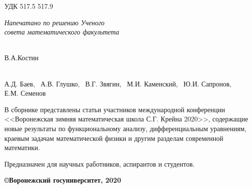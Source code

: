 \noindent УДК 517.5 517.9

\begin{flushright}
{\it Напечатано по решению Ученого \\ совета математического
факультета \\
}
 \end{flushright}
\vspace{15mm}{\bf Материалы работы международной конференции <<Воронежская зимняя математическая школа С.Г.
Крейна - 2020>>. Воронеж: ВГУ, 2020 -  с.}

\vspace{5mm}

 \\
В.А.Костин

\vspace{5mm}

 \\
А.Д. Баев, \  А.В. Глушко, \ В.Г. Звягин, \ М.И. Каменский, \ Ю.И. Сапронов, \\
Е.М. Семенов

\vspace{15mm}

В сборнике представлены статьи участников международной конференции <<Воронежская зимняя математическая школа С.Г. Крейна 2020>>,
содержащие новые
результаты по функциональному анализу, дифференциальным уравнениям,
краевым задачам математической физики и другим разделам современной
математики.

Предназначен для научных работников, аспирантов и студентов. \\

\vspace{8mm}

\begin{flushright}
{\bf \copyright Воронежский госуниверситет, 2020}
\end{flushright}

\newpage
